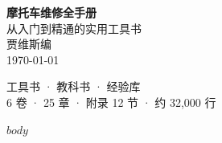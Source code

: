 \documentclass[11pt,a4paper,oneside]{book}
\begin{document}
\begin{titlepage}
\centering
\vspace*{3cm}
{\fontsize{36pt}{44pt}\selectfont\bfseries 摩托车维修全手册}\\[1.5cm]
{\Large 从入门到精通的实用工具书}\\[2cm]
{\large 贾维斯\quad 编}\\[1cm]
{\large \today}\\[4cm]
\begin{minipage}{0.85\textwidth}
\centering\small
工具书 · 教科书 · 经验库\\[0.5em]
6 卷 · 25 章 · 附录 12 节 · 约 32,000 行
\end{minipage}
\vfill
\end{titlepage}

\frontmatter
\tableofcontents

\mainmatter

$body$
\end{document}
